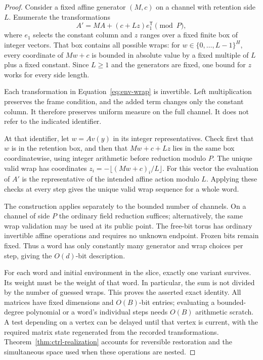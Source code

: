 \begin{proof}
Consider a fixed affine generator $(M,c)$ on a channel with retention
side $L$. Enumerate the transformations
\begin{equation}\label{eq:env-wrap}
A'=MA+(c+Lz)e_1^{\mathsf T}\pmod P,
\end{equation}
where $e_1$ selects the constant column and $z$ ranges over a fixed
finite box of integer vectors. That box contains all possible wraps:
for $w\in\{0,\ldots,L-1\}^H$, every coordinate of $Mw+c$ is bounded
in absolute value by a fixed multiple of $L$ plus a fixed constant.
Since $L\ge1$ and the generators are fixed, one bound for $z$ works
for every side length.

Each transformation in Equation~\eqref{eq:env-wrap} is invertible.
Left multiplication preserves the frame condition, and the added
term changes only the constant column. It therefore preserves uniform
measure on the full channel. It does not refer to the indicated
identifier.

At that identifier, let $w=Av(y)$ in its integer representatives.
Check first that $w$ is in the retention box, and then that
$Mw+c+Lz$ lies in the same box coordinatewise, using integer arithmetic
before reduction modulo $P$. The unique valid wrap has coordinates
$z_i=-\lfloor(Mw+c)_i/L\rfloor$. For this vector the evaluation of
$A'$ is the representative of the intended affine action modulo $L$.
Applying these checks at every step gives the unique valid wrap
sequence for a whole word.

The construction applies separately to the bounded number of channels.
On a channel of side $P$ the ordinary field reduction suffices;
alternatively, the same wrap validation may be used at its public
point. The free-bit torus has ordinary invertible affine operations
and requires no unknown endpoint. Frozen bits remain fixed.
Thus a word has only constantly many generator and wrap choices
per step, giving the $O(d)$-bit description.

For each word and initial environment in the slice, exactly one
variant survives. Its weight must be the weight of that word.
In particular, the sum is not divided by the number of guessed
wraps. This proves the asserted exact identity.
All matrices have fixed dimensions and $O(B)$-bit entries;
evaluating a bounded-degree polynomial or a word's individual steps
needs $O(B)$ arithmetic scratch. A test depending on a vertex can
be delayed until that vertex is current, with the required matrix
state regenerated from the recorded transformations.
Theorem~\ref{thm:ctrl-realization} accounts for reversible restoration
and the simultaneous space used when these operations are nested.
\end{proof}

